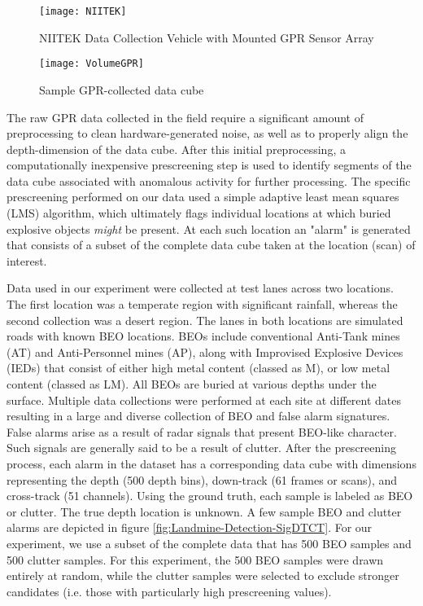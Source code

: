 \documentclass[12pt,dvips]{report}
\numberwithin{equation}{section}
\begin{document}
\begin{figure}[htb]
  \centerline{\texttt{[image: NIITEK]} }
 
\caption{NIITEK Data Collection Vehicle with Mounted GPR Sensor Array}
\label{fig:NIITEK}
\end{figure}
 
\begin{figure}[htb]
  \centerline{\texttt{[image: VolumeGPR]} }
 
\caption{Sample GPR-collected data cube}
\label{fig:VolumeGPR}
\end{figure}

The raw GPR data  collected in the field require a significant amount of preprocessing to clean hardware-generated noise, as well as to properly align the depth-dimension of the data cube.  After this initial preprocessing, a computationally inexpensive prescreening step is used to identify segments of the data cube associated with anomalous activity for further processing.  The specific prescreening performed on our data used a simple adaptive least mean squares (LMS) algorithm\cite{Torrione2003Pre}, which ultimately flags individual locations at which buried explosive objects \emph{might} be present.  At each such location an "alarm" is generated that consists of a subset of the complete data cube taken at the location (scan) of interest.

Data used in our experiment were collected at test lanes across two locations.  The first location was a temperate region with significant rainfall, whereas the second collection was a desert region. The lanes in both locations are simulated roads with known BEO locations. BEOs include conventional Anti-Tank mines (AT) and Anti-Personnel mines (AP), along with Improvised Explosive Devices (IEDs) that consist of either high metal content (classed as M), or low metal content (classed as LM). All BEOs are buried at various depths under the surface. Multiple data collections were performed at each site at different dates resulting in a large and diverse collection of BEO and false alarm signatures. False alarms arise as a result of radar signals that present BEO-like character. Such signals are generally said to be a result of clutter.  After the prescreening process, each alarm in the dataset has a corresponding data cube with dimensions representing the depth (500 depth bins), down-track (61 frames or scans), and cross-track (51 channels). Using the ground truth, each sample is labeled as BEO or clutter. The true depth location is unknown. A few sample BEO and clutter alarms are depicted in figure \ref{fig:Landmine-Detection-SigDTCT}.  For our experiment, we use a subset of the complete data that has 500 BEO samples and 500 clutter samples.  For this experiment, the 500 BEO samples were drawn entirely at random, while the clutter samples were selected to exclude stronger candidates (i.e. those with particularly high prescreening values).
\end{document}
